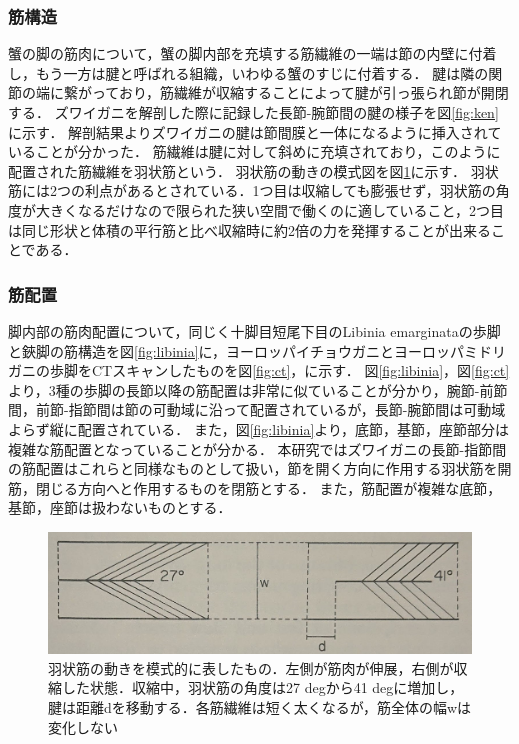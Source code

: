 \subsubsection{筋構造}
蟹の脚の筋肉について，蟹の脚内部を充填する筋繊維の一端は節の内壁に付着し，もう一方は腱と呼ばれる組織，いわゆる蟹のすじに付着する．
腱は隣の関節の端に繋がっており，筋繊維が収縮することによって腱が引っ張られ節が開閉する．
ズワイガニを解剖した際に記録した長節-腕節間の腱の様子を図\ref{fig:ken}に示す．
解剖結果よりズワイガニの腱は節間膜と一体になるように挿入されていることが分かった．
筋繊維は腱に対して斜めに充填されており，このように配置された筋繊維を羽状筋という．
羽状筋の動きの模式図を図\ref{fig:ujo}に示す．
羽状筋には2つの利点があるとされている．1つ目は収縮しても膨張せず，羽状筋の角度が大きくなるだけなので限られた狭い空間で働くのに適していること，2つ目は同じ形状と体積の平行筋と比べ収縮時に約2倍の力を発揮することが出来ることである\cite{warner1977biology}．
\subsubsection{筋配置}
脚内部の筋肉配置について，同じく十脚目短尾下目のLibinia emarginataの歩脚と鋏脚の筋構造を図\ref{fig:libinia}に，ヨーロッパイチョウガニとヨーロッパミドリガニの歩脚をCTスキャンしたものを図\ref{fig:ct}，に示す．
図\ref{fig:libinia}，図\ref{fig:ct}より，3種の歩脚の長節以降の筋配置は非常に似ていることが分かり，腕節-前節間，前節-指節間は節の可動域に沿って配置されているが，長節-腕節間は可動域よらず縦に配置されている．
また，図\ref{fig:libinia}より，底節，基節，座節部分は複雑な筋配置となっていることが分かる．
本研究ではズワイガニの長節-指節間の筋配置はこれらと同様なものとして扱い，節を開く方向に作用する羽状筋を開筋，閉じる方向へと作用するものを閉筋とする．
また，筋配置が複雑な底節，基節，座節は扱わないものとする．
\begin{figure}[t]
  \begin{minipage}{1\hsize}
    \centering
    \includegraphics[scale=0.3]{image/ujo.JPG}
    \caption{羽状筋の動きを模式的に表したもの．左側が筋肉が伸展，右側が収縮した状態．収縮中，羽状筋の角度は27 degから41 degに増加し，腱は距離dを移動する．各筋繊維は短く太くなるが，筋全体の幅wは変化しない\cite{warner1977biology}}
   \label{fig:ujo}
  \end{minipage}
\end{figure}
  
